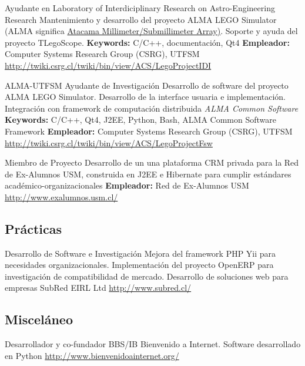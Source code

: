\documentclass[11pt,a4paper]{moderncv}
\begin{document}
        {Ayudante en Laboratory of Interdiciplinary Research on Astro-Engineering Research}
        {Mantenimiento y desarrollo del proyecto ALMA LEGO Simulator (ALMA significa \href{http://www.alma.cl/}{Atacama Millimeter/Submillimeter Array)}. Soporte y ayuda del proyecto TLegoScope.}
        {\textbf{Keywords:} C/C++, documentación, Qt4}
        {\textbf{Empleador:} Computer Systems Research Group (CSRG), UTFSM}
        {\url{http://twiki.csrg.cl/twiki/bin/view/ACS/LegoProjectIDI}}

        {ALMA-UTFSM Ayudante de Investigación}
        {Desarrollo de software del proyecto ALMA LEGO Simulator. Desarrollo de la interface usuaria e implementación. Integración con framework de computación distribuida \emph{ALMA Common Software}}
        {\textbf{Keywords:} C/C++, Qt4, J2EE, Python, Bash, ALMA Common Software Framework}
        {\textbf{Empleador:} Computer Systems Research Group (CSRG), UTFSM}
        {\url{http://twiki.csrg.cl/twiki/bin/view/ACS/LegoProjectFsw}}
        
        {Miembro de Proyecto}
        {Desarrollo de un una plataforma CRM privada para la Red de Ex-Alumnos USM, construida en J2EE e Hibernate para cumplir estándares académico-organizacionales}
        {\textbf{Empleador:} Red de Ex-Alumnos USM}
        {}
        {\url{http://www.exalumnos.usm.cl/}}
        
        
\subsection{Prácticas}


        {Desarrollo de Software e Investigación}
        {Mejora del framework PHP Yii para necesidades organizacionales. Implementación del proyecto OpenERP para investigación de compatibilidad de mercado. Desarrollo de soluciones web para empresas}
        {SubRed EIRL Ltd}
        {}
        {\url{http://www.subred.cl/}}
        
        
\subsection{Misceláneo}


        {Desarrollador y co-fundador}
        {BBS/IB Bienvenido a Internet. Software desarrollado en Python}
        {}
        {}
        {\url{http://www.bienvenidoainternet.org/}}
        
\end{document}
